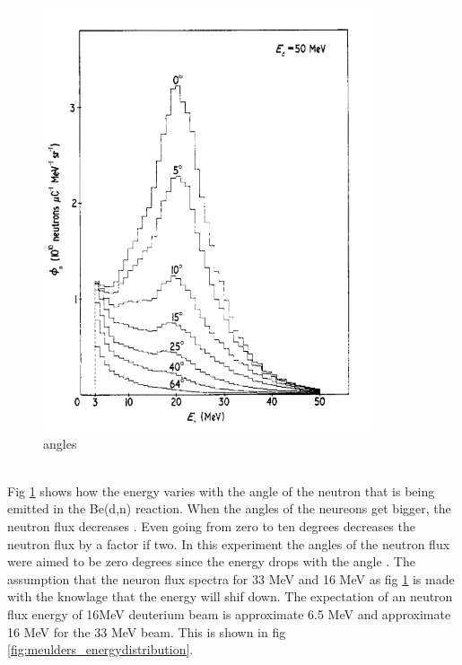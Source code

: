 \documentclass[twoside,english]{uiofysmaster/uiofysmaster}
\begin{document}
\begin{figure} [h!]
   \centering
   \includegraphics[width=.6\linewidth ]{zero_degrees_moulder.png}
   \caption{angles}
   \label{fig:angles_moulder}
\end{figure}
\noindent
\\
Fig \ref{fig:angles_moulder} shows how the energy varies with the angle of the neutron that is being emitted in the Be(d,n) reaction. When the angles of the neureons get bigger, the neutron flux decreases \cite{Meulders}. Even going from zero to ten degrees decreases the neutron flux by a factor if two. In this experiment the angles of the neutron flux were aimed to be zero degrees since the energy drops with the angle \cite{Meulders}. The assumption that the neuron flux spectra for 33 MeV and 16 MeV as fig \ref{fig:angles_moulder} is made with the knowlage that the energy will shif down. The expectation of an neutron flux energy of 16MeV deuterium beam is approximate 6.5 MeV and approximate 16 MeV for the 33 MeV beam. This is shown in fig \ref{fig:meulders_energydistribution}.
\end{document}
